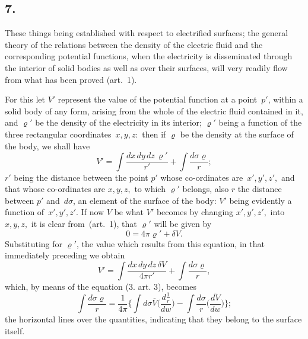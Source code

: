 \documentclass[11pt,notitlepage]{amsart}
\newcommand\Section[1]{\subsection{{#1}}}
\renewcommand{\rho}{\varrho}
\begin{document}
\Section{7.}
These things being established with respect to electrified surfaces; the
general theory of the relations between the density of the electric fluid and
the corresponding potential functions,
when the electricity is disseminated through
the interior of solid bodies as well as over their surfaces, will very readily
flow from what has been proved (art.~1).

For this let $V'$ represent the value of the potential function
at a point~$p'$,
within a solid body of any form, arising from the whole of the electric fluid
contained in it, and $\rho'$ be
the density of the electricity in its interior; $\rho'$ being
a function of the three rectangular coordinates~$x,y,z:$
then if $\rho$ be the density
at the surface of the body, we shall have
\[
V'=\int\frac{dx\,dy\,dz\,\rho'}{r'}+\int\frac{d\sigma\rho}{r};
\]
$r'$ being the distance between the point $p'$
whose co-ordinates are~$x',y',z',$
and that whose co-ordinates are $x,y,z,$
to which $\rho'$ belongs, also $r$ the
distance between $p'$ and~$d\sigma$,
an element of the surface of the body: $V'$ being
evidently a function of~$x',y',z'$. If now $V$ be
what $V'$ becomes by changing
$x',y',z',$ into~$x,y,z,$ it is clear from~(art.~1),
that $\rho'$ will be given by
\[
0=4\pi\rho'+\delta V.
\]
Substituting for $\rho'$,
the value which results from this equation, in that immediately
preceding we obtain
\[
V'=\int\frac{dx\,dy\,dz\,\delta V}{4\pi r'}+\int\frac{d\sigma\rho}{r},
\]
which, by means of the equation (3. art. 3), becomes
\[
\int\frac{d\sigma\rho}{r}=
\frac{1}{4\pi}\biggl\{
  \int d\sigma\overline{V}
  \biggl(\frac{d\frac1r}{dw}\biggr)
  -\int\frac{d\sigma}{r}
  \biggl(\frac{\overline{dV}}{dw}\biggr)
\biggr\};
\]
the horizontal lines over the quantities, indicating that they belong to the
surface itself.
\end{document}
